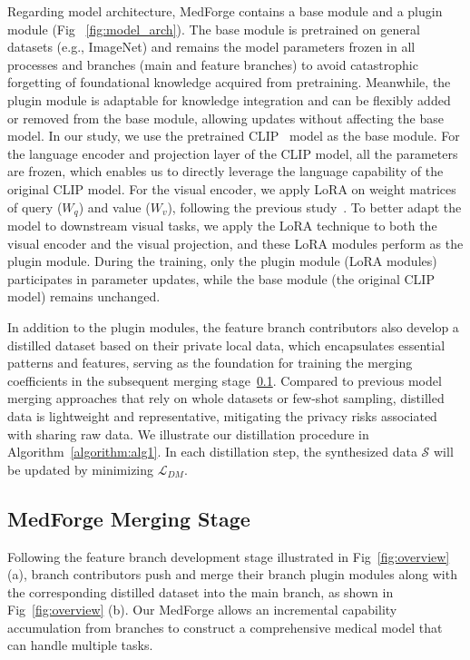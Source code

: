 Regarding model architecture, MedForge contains a base module and a plugin module (Fig ~\ref{fig:model_arch}). The base module is pretrained on general datasets (e.g., ImageNet) and remains the model parameters frozen in all processes and branches (main and feature branches) to avoid catastrophic forgetting of foundational knowledge acquired from pretraining. Meanwhile, the plugin module is adaptable for knowledge integration and can be flexibly added or removed from the base module, allowing updates without affecting the base model. In our study, we use the pretrained CLIP~\cite{radford2021learning} model as the base module. For the language encoder and projection layer of the CLIP model, all the parameters are frozen, which enables us to directly leverage the language capability of the original CLIP model. For the visual encoder, we apply LoRA on weight matrices of query ($W_q$) and value ($W_v$), following the previous study~\cite{hu2021lora}. To better adapt the model to downstream visual tasks, we apply the LoRA technique to both the visual encoder and the visual projection, and these LoRA modules perform as the plugin module. During the training, only the plugin module (LoRA modules) participates in parameter updates, while the base module (the original CLIP model) remains unchanged. 

In addition to the plugin modules, the feature branch contributors also develop a distilled dataset based on their private local data, which encapsulates essential patterns and features, serving as the foundation for training the merging coefficients in the subsequent merging stage~\ref{forging}. Compared to previous model merging approaches that rely on whole datasets or few-shot sampling, distilled data is lightweight and representative, mitigating the privacy risks associated with sharing raw data. 
We illustrate our distillation procedure in Algorithm~\ref{algorithm:alg1}. In each distillation step, the synthesized data $\mathcal{S}$ will be updated by minimizing $\mathcal{L}_{DM}$.



\subsection{MedForge Merging Stage}
\label{forging}
Following the feature branch development stage illustrated in Fig~\ref{fig:overview} (a), branch contributors push and merge their branch plugin modules along with the corresponding distilled dataset into the main branch, as shown in Fig~\ref{fig:overview} (b). Our MedForge allows an incremental capability accumulation from branches to construct a comprehensive medical model that can handle multiple tasks.

